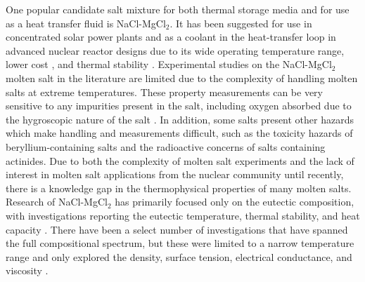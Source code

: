 \documentclass[review]{elsarticle}
\begin{document}
One popular candidate salt mixture for both thermal storage media and for use as a heat transfer fluid is NaCl-MgCl$_{2}$. It has been suggested for use in concentrated solar power plants and as a coolant in the heat-transfer loop in advanced nuclear reactor designs due to its wide operating temperature range, lower cost \cite{williams2008evaluation}, and thermal stability \cite{XU2020568,williams2006assessment}. Experimental studies on the NaCl-MgCl$_2$ molten salt in the literature are limited due to the complexity of handling molten salts at extreme temperatures. These property measurements can be very sensitive to any impurities present in the salt, including oxygen absorbed due to the hygroscopic nature of the salt \cite{bell2019corrosion}. In addition, some salts present other hazards which make handling and measurements difficult, such as the toxicity hazards of beryllium-containing salts and the radioactive concerns of salts containing actinides. Due to both the complexity of molten salt experiments and the lack of interest in molten salt applications from the nuclear community until recently, there is a knowledge gap in the thermophysical properties of many molten salts. Research of NaCl-MgCl$_{2}$ has primarily focused only on the eutectic composition, with investigations reporting the eutectic temperature, thermal stability, and heat capacity \cite{MOHAN2018156}. There have been a select number of investigations that have spanned the full compositional spectrum, but these were limited to a narrow temperature range and only explored the density, surface tension, electrical conductance, and viscosity \cite{Janz1988}.
\end{document}

